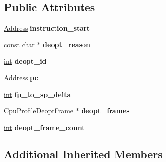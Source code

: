 \subsection*{Public Attributes}
\begin{DoxyCompactItemize}
\item 
\mbox{\label{classv8_1_1internal_1_1CodeDeoptEventRecord_a1de3e129caba4ed37c985aabca14094d}} 
\mbox{\hyperlink{classuintptr__t}{Address}} {\bfseries instruction\+\_\+start}
\item 
\mbox{\label{classv8_1_1internal_1_1CodeDeoptEventRecord_a2389264ef7bcc34febd142099109dac4}} 
const \mbox{\hyperlink{classchar}{char}} $\ast$ {\bfseries deopt\+\_\+reason}
\item 
\mbox{\label{classv8_1_1internal_1_1CodeDeoptEventRecord_a347ff4584bd2af3dede2e842d9d9c965}} 
\mbox{\hyperlink{classint}{int}} {\bfseries deopt\+\_\+id}
\item 
\mbox{\label{classv8_1_1internal_1_1CodeDeoptEventRecord_a005471829abc9a3204380d203fb3e8c6}} 
\mbox{\hyperlink{classuintptr__t}{Address}} {\bfseries pc}
\item 
\mbox{\label{classv8_1_1internal_1_1CodeDeoptEventRecord_abbe867ca7f45b8d7e577bfd50ec15eee}} 
\mbox{\hyperlink{classint}{int}} {\bfseries fp\+\_\+to\+\_\+sp\+\_\+delta}
\item 
\mbox{\label{classv8_1_1internal_1_1CodeDeoptEventRecord_a031c12b5fe6fce9ab91efd298409e09b}} 
\mbox{\hyperlink{structv8_1_1CpuProfileDeoptFrame}{Cpu\+Profile\+Deopt\+Frame}} $\ast$ {\bfseries deopt\+\_\+frames}
\item 
\mbox{\label{classv8_1_1internal_1_1CodeDeoptEventRecord_a8f4578817c1ed1661566096c980c9147}} 
\mbox{\hyperlink{classint}{int}} {\bfseries deopt\+\_\+frame\+\_\+count}
\end{DoxyCompactItemize}
\subsection*{Additional Inherited Members}


